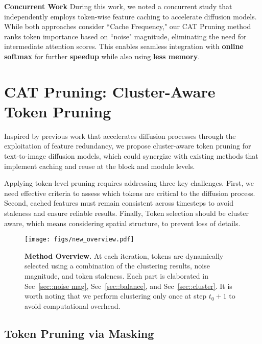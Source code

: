 \documentclass[10pt]{article}
\begin{document}
\textbf{Concurrent Work}
During this work, we noted a concurrent study \citep{zou2024acceleratingdiffusiontransformerstokenwise} that independently employs token-wise feature caching to accelerate diffusion models. While both approaches consider ``Cache Frequency," our CAT Pruning method ranks token importance based on ``noise" magnitude, eliminating the need for intermediate attention scores. This enables seamless integration with \textbf{online softmax} \citep{milakov2018onlinenormalizercalculationsoftmax, NEURIPS2022_67d57c32} for further \textbf{speedup} while also using \textbf{less memory}.

\section{CAT Pruning: Cluster-Aware Token Pruning}
Inspired by previous work that accelerates diffusion processes through the exploitation of feature redundancy, we propose cluster-aware token pruning for text-to-image diffusion models, which could synergize with existing methods that implement caching and reuse at the block and module levels.


Applying token-level pruning requires addressing three key challenges. First, we need effective criteria to assess which tokens are critical to the diffusion process. Second, cached features must remain consistent across timesteps to avoid staleness and ensure reliable results. Finally, Token selection should be cluster aware, which means considering spatial structure, to prevent loss of details.





\begin{figure}[H]
    \centering
    \texttt{[image: figs/new\_overview.pdf]}
    \caption{\textbf{Method Overview.} At each iteration, tokens are dynamically selected using a combination of the clustering results, noise magnitude, and token staleness. Each part is elaborated in Sec~\ref{sec::noise mag}, Sec~\ref{sec::balance}, and Sec~\ref{sec::cluster}. It is worth noting that we perform clustering only once at step $t_0+1$ to avoid computational overhead.}
    \label{fig:overview}
\end{figure}
\subsection{Token Pruning via Masking}

\begin{algorithm}

\end{algorithm}
\end{document}
